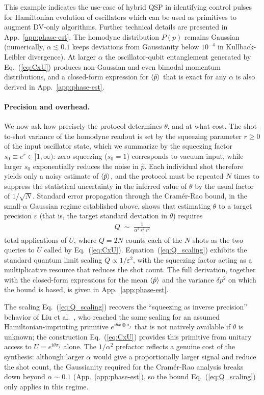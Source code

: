 \documentclass[aps,prx,showpacs,notitlepage,twocolumn,superscriptaddress,nofootinbib,preprintnumbers,floatfix,10pt, longbibliography]{revtex4-2}
\begin{document}
This example indicates the use-case
of hybrid QSP in identifying control pulses for Hamiltonian evolution
of oscillators which can be used as primitives to augment DV-only algorithms.
Further technical details are presented in App.~\ref{app:phase-est}.
The homodyne distribution $P(p)$
remains Gaussian (numerically, $\alpha\lesssim 0.1$ keeps deviations
from Gaussianity below $10^{-4}$ in Kullback-Leibler divergence).
At larger $\alpha$ the oscillator-qubit
entanglement generated by Eq.~(\ref{eq:CxU}) produces non-Gaussian
and even bimodal momentum distributions, and a closed-form expression
for $\braket{\hat{p}}$ that is exact for any $\alpha$ is also derived
in App.~\ref{app:phase-est}.  

\paragraph{Precision and overhead.}
We now ask how precisely the protocol determines $\theta$, and at
what cost. The shot-to-shot variance of the homodyne readout is set
by the squeezing parameter $r\geq 0$ of the input oscillator state,
which we summarize by the squeezing factor
$s_0\equiv e^r\in[1,\infty)$: zero squeezing ($s_0=1$) corresponds to
vacuum input, while larger $s_0$ exponentially reduces the noise in
$\hat{p}$. Each individual shot therefore yields only a noisy
estimate of $\braket{\hat{p}}$, and the protocol must be repeated $N$
times to suppress the statistical uncertainty in the inferred value
of $\theta$ by the usual factor of $1/\sqrt{N}$. Standard error
propagation through the Cramér-Rao bound, in the small-$\alpha$
Gaussian regime established above, shows that estimating $\theta$ to
a target precision $\varepsilon$ (that is, the target standard deviation
 in $\theta$) requires
\begin{align}
  Q \;\sim\; \frac{1}{\alpha^2\,s_0^2\,\varepsilon^2}
  \label{eq:Q_scaling}
\end{align}
total applications of $U$, where $Q=2N$ counts each of the $N$ shots
as the two queries to $U$ called by Eq.~(\ref{eq:CxU}).
Equation~(\ref{eq:Q_scaling}) exhibits the standard quantum limit
scaling $Q\propto 1/\varepsilon^2$, with the squeezing factor acting
as a multiplicative resource that reduces the shot count. The full
derivation, together with the closed-form expressions for the mean
$\braket{\hat{p}}$ and the variance $\delta p^2$ on which the bound is
based, is given in App.~\ref{app:phase-est}.

The scaling Eq.~(\ref{eq:Q_scaling}) recovers the ``squeezing as
inverse precision'' behavior of Liu et al.~\cite{liu2016power}, who
reached the same scaling for an assumed Hamiltonian-imprinting
primitive $e^{i\theta\hat{x}\otimes\sigma_\mathrm{y}}$ that is not
natively available if $\theta$ is unknown; the construction
Eq.~(\ref{eq:CxU}) provides this primitive from unitary access to
$U=e^{i\theta\sigma_\mathrm{y}}$ alone. The $1/\alpha^2$ prefactor
reflects a genuine cost of the synthesis: although larger $\alpha$
would give a proportionally larger signal and reduce the shot count,
the Gaussianity required for the Cramér-Rao analysis breaks down
beyond $\alpha\sim 0.1$ (App.~\ref{app:phase-est}), so the bound
Eq.~(\ref{eq:Q_scaling}) only applies in this regime.
\end{document}
